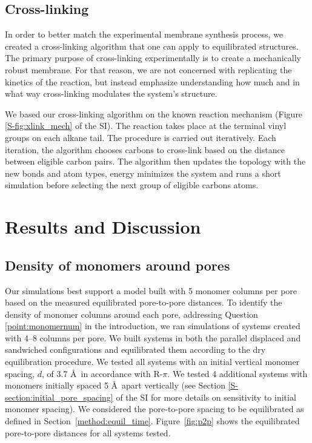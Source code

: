 \documentclass[journal=jpcbfk,manuscript=article]{achemso}
\begin{document}
  \subsection{Cross-linking}\label{method:xlink}
  
  In order to better match the experimental membrane synthesis process,
  we created a cross-linking algorithm that one can apply to equilibrated structures. 
  The primary purpose of cross-linking experimentally is to create a mechanically robust membrane.
  For that reason, we are not concerned with replicating the kinetics of the reaction, 
  but instead emphasize understanding how much and in what way cross-linking modulates
  the system's structure.

  We based our cross-linking algorithm on the known reaction mechanism 
  (Figure \ref{S-fig:xlink_mech} of the SI). The reaction 
  takes place at the terminal vinyl groups
  on each alkane tail. The procedure is carried out iteratively. Each iteration, the
  algorithm chooses carbons to cross-link based on the distance between eligible 
  carbon pairs. The algorithm then updates the topology with the new bonds and atom
  types, energy minimizes the system and runs a short simulation before selecting 
  the next group of eligible carbons atoms.
  
  \section{Results and Discussion}
  
  \subsection{Density of monomers around pores}\label{section:mon_per_pore}
  
  Our simulations best support a model built with 5 monomer columns per pore
  based on the measured equilibrated pore-to-pore distances. To identify the
  density of monomer columns around each pore, addressing Question
  \ref{point:monomernum} in the introduction, we ran simulations of systems
  created with 4--8 columns per pore. We built systems in both the parallel
  displaced and sandwiched configurations and equilibrated them according to the
  dry equilibration procedure. We tested all systems with an initial vertical
  monomer spacing, $\mathit{d}$, of 3.7 \AA~in accordance with R-$\pi$. We tested
  4 additional systems with monomers initially spaced 5 \AA~apart vertically (see
  Section \ref{S-section:initial_pore_spacing} of the SI for more details on
  sensitivity to initial monomer spacing). We considered the pore-to-pore
  spacing to be equilibrated as defined in Section~\ref{method:equil_time}.
  Figure~\ref{fig:p2p} shows the equilibrated pore-to-pore distances for all
  systems tested. 
  
\end{document}

